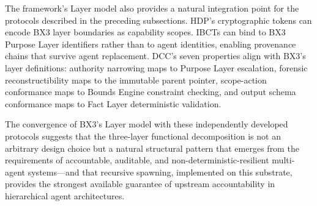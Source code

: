 The framework's Layer model also provides a natural integration point for the protocols described in the preceding subsections. HDP's cryptographic tokens can encode BX3 layer boundaries as capability scopes. IBCTs can bind to BX3 Purpose Layer identifiers rather than to agent identities, enabling provenance chains that survive agent replacement. DCC's seven properties align with BX3's layer definitions: authority narrowing maps to Purpose Layer escalation, forensic reconstructibility maps to the immutable parent pointer, scope-action conformance maps to Bounds Engine constraint checking, and output schema conformance maps to Fact Layer deterministic validation.

The convergence of BX3's Layer model with these independently developed protocols suggests that the three-layer functional decomposition is not an arbitrary design choice but a natural structural pattern that emerges from the requirements of accountable, auditable, and non-deterministic-resilient multi-agent systems---and that recursive spawning, implemented on this substrate, provides the strongest available guarantee of upstream accountability in hierarchical agent architectures.
